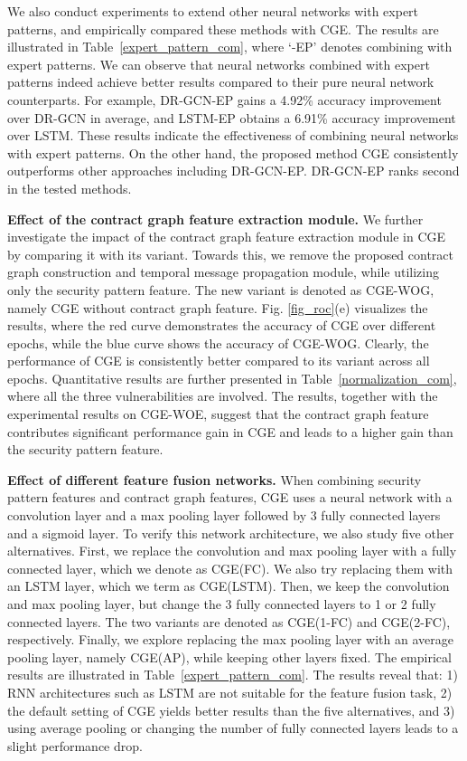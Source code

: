 We also conduct experiments to extend other neural networks with expert patterns, and empirically compared these methods with CGE. The results are illustrated in Table~\ref{expert_pattern_com}, where `-EP' denotes combining with expert patterns. We can observe that neural networks combined with expert patterns indeed achieve better results compared to their pure neural network counterparts. For example, DR-GCN-EP gains a 4.92\% accuracy improvement over DR-GCN in average, and LSTM-EP obtains a 6.91\% accuracy improvement over LSTM. These results indicate the effectiveness of combining neural networks with expert patterns. On the other hand, the proposed method CGE consistently outperforms other approaches including DR-GCN-EP. DR-GCN-EP ranks second in the tested methods.

\textbf{Effect of the contract graph feature extraction module.} We further investigate the impact of the contract graph feature extraction module in CGE by comparing it with its variant. Towards this, we remove the proposed contract graph construction and temporal message propagation module, while utilizing only the security pattern feature. The new variant is denoted as CGE-WOG, namely CGE without contract graph feature. Fig. \ref{fig_roc}(e) visualizes the results, where the red curve demonstrates the accuracy of CGE over different epochs, while the blue curve shows the accuracy of CGE-WOG. Clearly, the performance of CGE is consistently better compared to its variant across all epochs. Quantitative results are further presented in Table~\ref{normalization_com}, where all the three vulnerabilities are involved. The results, together with the experimental results on CGE-WOE, suggest that the contract graph feature contributes significant performance gain in CGE and leads to a higher gain than the security pattern feature. 

 \textbf{Effect of different feature fusion networks.} When combining security pattern features and contract graph features, CGE uses a neural network with a convolution layer and a max pooling layer followed by 3 fully connected layers and a sigmoid layer. To verify this network architecture, we also study five other alternatives. First, we replace the convolution and max pooling layer with a fully connected layer, which we denote as CGE(FC). We also try replacing them with an LSTM layer, which we term as CGE(LSTM). Then, we keep the convolution and max pooling layer, but change the 3 fully connected layers to 1 or 2 fully connected layers. The two variants are denoted as CGE(1-FC) and CGE(2-FC), respectively. Finally, we explore replacing the max pooling layer with an average pooling layer, namely CGE(AP), while keeping other layers fixed. The empirical results are illustrated in Table~\ref{expert_pattern_com}. The  results reveal that: 1) RNN architectures such as LSTM are not suitable for the feature fusion task, 2) the default setting of CGE yields better results than the five alternatives, and 3) using average pooling or changing the number of fully connected layers leads to a slight performance drop.

